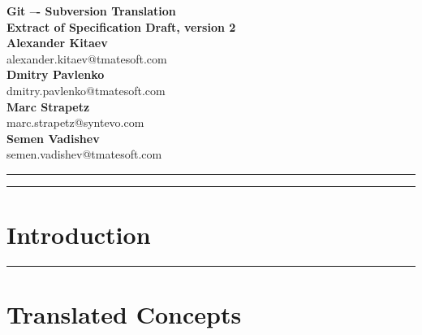 \documentclass[aps,%
12pt,%
final,%
oneside,
onecolumn,%
superscriptaddress,%
centertags]{article} %
\begin{document}
\begin{titlepage}
\begin{center}

\textbf{\LARGE Git –- Subversion Translation} \\[2.0cm]
\textbf{\Large Extract of Specification Draft, version 2}\\[3.0cm]

\textbf{Alexander Kitaev} \\[0.2cm]
\textnormal{alexander.kitaev@tmatesoft.com} \\[1.0cm]

\textbf{Dmitry Pavlenko} \\[0.2cm]
\textnormal{dmitry.pavlenko@tmatesoft.com} \\[1.0cm]

\textbf{Marc Strapetz} \\[0.2cm]
\textnormal{marc.strapetz@syntevo.com} \\[1.0cm]

\textbf{Semen Vadishev} \\[0.2cm]
\textnormal{semen.vadishev@tmatesoft.com} \\[1.0cm]

\end{center}
\end{titlepage}

\topmargin=-10pt
\setcounter{page}{2}

\newpage
\hrule
\tableofcontents

\newpage
\hrule
\section{Introduction}


\newpage
\hrule
\section{Translated Concepts}

\end{document}
